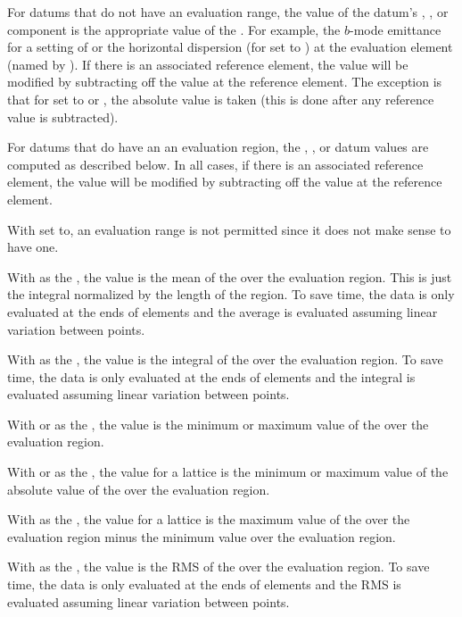 For datums that do not have an evaluation range, the value of the datum's , , or
 component is the appropriate value of the . For example, the $b$-mode
emittance for a  setting of  or the horizontal dispersion (for
 set to ) at the evaluation element (named by ). If there is
an associated reference element, the value will be modified by subtracting off the 
value at the reference element. The exception is that for  set to  or
, the absolute value is taken (this is done after any reference value is subtracted).

For datums that do have an an evaluation region, the , , or  datum values
are computed as described below. In all cases, if there is an associated reference element, the value
will be modified by subtracting off the  value at the reference element.
\begin{description}[itemsep=0pt,topsep=0pt]
%
\item["target"] \Newline
With  set to, an evaluation range is not permitted since it does not
make sense to have one.
%
\item["average"] \Newline
With  as the , the value is the mean of the
 over the evaluation region. This is just the integral normalized by the length of the
region. To save time, the data is only evaluated at the ends of elements
and the average is evaluated assuming linear variation between points.
%
\item["integral"] \Newline
With  as the , the value is the integral of the  over
the evaluation region. To save time, the data is only evaluated at the ends of elements and the
integral is evaluated assuming linear variation between points.
%
\item["min" or "max"] \Newline
With  or  as the , the value
is the minimum or maximum value of the  over the evaluation region.
%
\item["abs_min" or "abs_max"] \Newline
With  or  as the , the value for a lattice is the minimum
or maximum value of the absolute value of the  over the evaluation region.
%
\item["max-min"] \Newline
With  as the , the value for a lattice is the maximum value of the
 over the evaluation region minus the minimum value over the evaluation region.
%
\item["rms"] \Newline
With  as the , the value is the RMS of the
 over the evaluation region. To save time, the data is only evaluated at the ends of elements
and the RMS is evaluated assuming linear variation between points.
\end{description}

